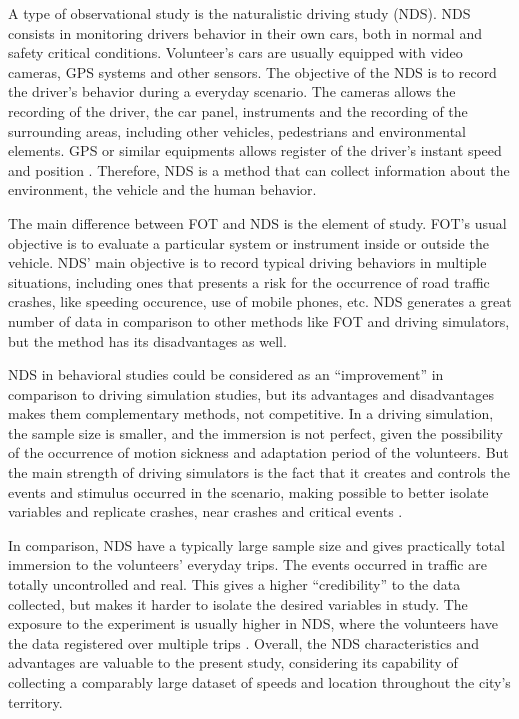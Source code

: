 A type of observational study is the naturalistic driving study (NDS). NDS consists in monitoring drivers behavior in their own cars, both in normal and safety critical conditions. Volunteer's cars are usually equipped with video cameras, GPS systems and other sensors. The objective of the NDS is to record the driver's behavior during a everyday scenario. The cameras allows the recording of the driver, the car panel, instruments and the recording of the surrounding areas, including other vehicles, pedestrians and environmental elements. GPS or similar equipments allows register of the driver's instant speed and position \cite{Shinar2017}. Therefore, NDS is a method that can collect information about the environment, the vehicle and the human behavior.

The main difference between FOT and NDS is the element of study. FOT's usual objective is to evaluate a particular system or instrument inside or outside the vehicle. NDS' main objective is to record typical driving behaviors in multiple situations, including ones that presents a risk for the occurrence of road traffic crashes, like speeding occurence, use of mobile phones, etc. NDS generates a great number of data in comparison to other methods like FOT and driving simulators, but the method has its disadvantages as well. 

NDS in behavioral studies could be considered as an ``improvement'' in comparison to driving simulation studies, but its advantages and disadvantages makes them complementary methods, not competitive. In a driving simulation, the sample size is smaller, and the immersion is not perfect, given the possibility of the occurrence of motion sickness and adaptation period of the volunteers. But the main strength of driving simulators is the fact that it creates and controls the events and stimulus occurred in the scenario, making possible to better isolate variables and replicate crashes, near crashes and critical events \cite{Shinar2017}.   

In comparison, NDS have a typically large sample size and gives practically total immersion to the volunteers' everyday trips. The events occurred in traffic are totally uncontrolled and real. This gives a higher ``credibility'' to the data collected, but makes it harder to isolate the desired variables in study. The exposure to the experiment is usually higher in NDS, where the volunteers have the data registered over multiple trips \cite{Carsten2013}. Overall, the NDS characteristics and advantages are valuable to the present study, considering its capability of collecting a comparably large dataset of speeds and location throughout the city's territory.

